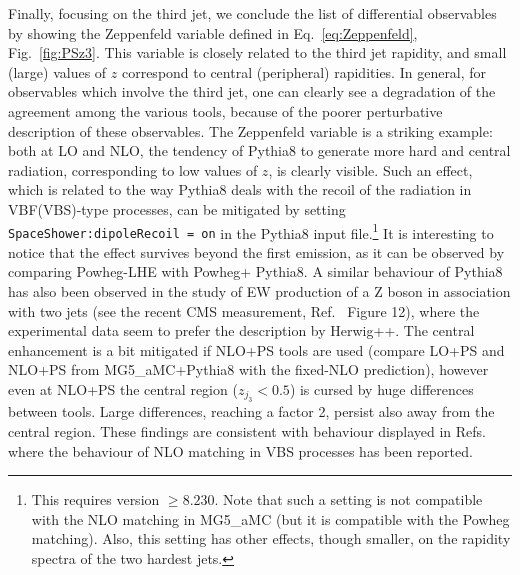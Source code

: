 \documentclass[twocolumn,epjc3]{svjour3} %
\newcommand{\PZ}{\ensuremath{\text{Z}}\xspace}
\begin{document}
Finally, focusing on the third jet, we conclude the list of differential observables by showing the Zeppenfeld variable defined in Eq.~\eqref{eq:Zeppenfeld}, Fig.~\ref{fig:PSz3}. This
variable is closely related to the third jet rapidity, and small (large) values of $z$ correspond to central (peripheral) rapidities. In general, for observables which involve the third jet, one
can clearly see a degradation of the agreement among the various tools, because of the poorer perturbative description of these observables. The Zeppenfeld variable is
a striking example: both at LO and NLO, the tendency of {\sc Pythia8} to generate more hard and central radiation, corresponding to low values of $z$,
is clearly visible. Such an effect, which is related to the way {\sc Pythia8} deals with the recoil of the radiation in VBF(VBS)-type processes,
can be mitigated by setting {\tt SpaceShower:dipole\-Recoil = on} in the {\sc Pythia8} input file.\footnote{This requires version $\ge8.230$.
Note that such a setting is not compatible with the NLO matching
in {\sc MG5\_aMC} (but it is compatible with the {\sc Powheg} matching). Also, this setting has other
effects, though smaller, on the rapidity spectra of the two hardest jets.} It is interesting to notice that
the effect survives beyond the first emission, as it can be observed by comparing {\sc Powheg-LHE} with {\sc Powheg+ Pythia8}. A similar
behaviour of {\sc Pythia8}
has also been observed in the study of EW production of a $\PZ$ boson in association with two jets (see the recent CMS measurement,
Ref.~\cite{Sirunyan:2017jej} Figure 12), where the experimental data seem to prefer the description by {\sc Herwig++}.
The central enhancement
is a bit mitigated if NLO+PS tools are used (compare LO+PS and NLO+PS from {\sc MG5\_aMC+Pythia8} with the fixed-NLO prediction), however even at NLO+PS the central region
($z_{j_3}<0.5$) is cursed by huge differences between tools. Large differences, reaching a factor 2, persist also away from the central region. These findings are consistent with behaviour displayed in Refs.~\cite{Jager:2011ms,Jager:2012xk,Jager:2013mu,Jager:2013iza,Schissler:2013nga} where the behaviour of NLO matching in VBS processes has been reported.\\
\end{document}
